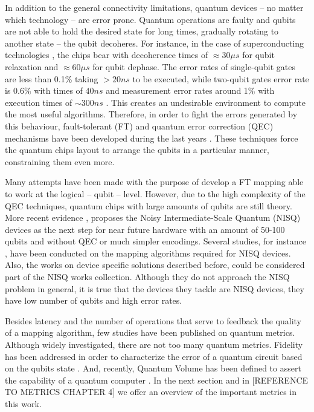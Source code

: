 In addition to the general connectivity limitations, quantum devices -- no matter which technology -- are error prone.
Quantum operations are faulty and qubits are not able to hold the desired state for long times, gradually rotating to another state -- the qubit decoheres.
For instance, in the case of superconducting technologies \cite{O_Brien_2017}, the chips bear with decoherence times of \(\approx 30 \mu s\) for qubit relaxation and \(\approx 60 \mu s\) for qubit dephase.
The error rates of single-qubit gates are less than 0.1\% taking \(> 20 ns\) to be executed, while two-qubit gates error rate is 0.6\% with times of \(40 ns\) and measurement error rates around 1\% with execution times of \(\sim 300 ns\) \cite{O_Brien_2017,Versluis_2017}.
This creates an undesirable environment to compute the most useful algorithms.
Therefore, in order to fight the errors generated by this behaviour, fault-tolerant (FT) and quantum error correction (QEC) mechanisms have been developed during the last years \cite{Nielsen_2009}.
These techniques force the quantum chips layout to arrange the qubits in a particular manner, constraining them even more.

Many attempts have been made \cite{Dousti_2014,Heckey_2015,hwang18:hierar_system_mappin_large_scale,murphy18:contr,Lao_2018} with the purpose of develop a FT mapping able to work at the logical -- qubit -- level.
However, due to the high complexity of the QEC techniques, quantum chips with large amounts of qubits are still theory.
More recent evidence \cite{Preskill_2018}, proposes the Noisy Intermediate-Scale Quantum (NISQ) devices as the next step for near future hardware with an amount of 50-100 qubits and without QEC or much simpler encodings.
Several studies, for instance \cite{tannu18:case_variab_aware_polic_nisq,paler18:nisq,paler18:influen_initial_qubit_placem_durin}, have been conducted on the mapping algorithms required for NISQ devices.
Also, the works on device specific solutions \cite{zulehner17:effic_method_mappin_quant_circuit,Siraichi_2018,mckay18:qiskit_backen_specif_openq_openp_exper,Dueck_2018,Venturelli_2018} described before, could be considered part of the NISQ works collection.
Although they do not approach the NISQ problem in general, it is true that the devices they tackle are NISQ devices, they have low number of qubits and high error rates.

Besides latency and the number of operations that serve to feedback the quality of a mapping algorithm, few studies have been published on quantum metrics.
Although widely investigated, there are not too many quantum metrics.
Fidelity has been addressed in order to characterize the error of a quantum circuit based on the qubits state \cite{Jozsa_1994,Nielsen_2009}.
And, recently, Quantum Volume has been defined to assert the capability of a quantum computer \cite{Moll_2018}.
In the next section and in [REFERENCE TO METRICS CHAPTER 4] we offer an overview of the important metrics in this work.

